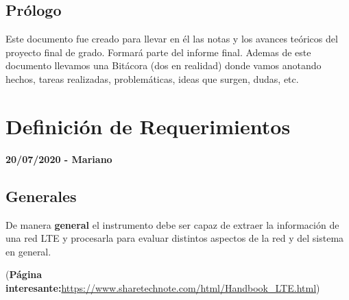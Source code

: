 \documentclass[a4paper,12pt]{report} %
\begin{document}
	
\section*{Prólogo}
Este documento fue creado para llevar en él las notas y los avances teóricos del proyecto final de grado. Formará parte del informe final.
Ademas de este documento llevamos una Bitácora (dos en realidad) donde vamos anotando hechos, tareas realizadas, problemáticas, ideas que surgen, dudas, etc. 
\thispagestyle{empty}

 \chapter{Definición de Requerimientos}

\textbf{20/07/2020 - Mariano}

\section{Generales}

De manera \textbf{general} el instrumento debe ser capaz de extraer la información de una red LTE y procesarla para evaluar distintos aspectos de la red y del sistema en general.

(\textbf{Página interesante:}\url{https://www.sharetechnote.com/html/Handbook_LTE.html})
\end{document}
